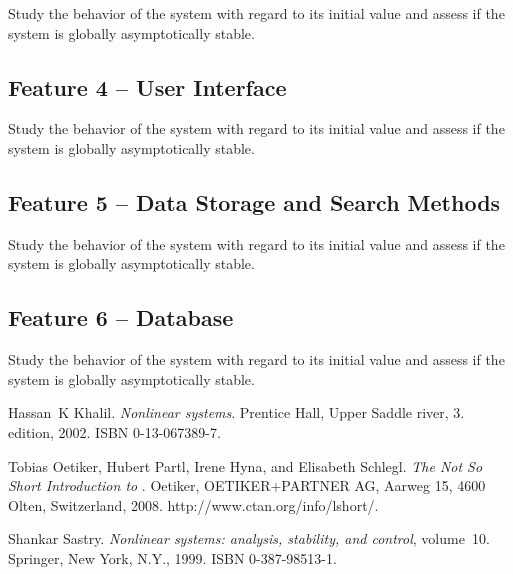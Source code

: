 \documentclass[a4paper]{article} %
\begin{document}
Study the behavior of the system with regard to its initial value and assess if the system is globally asymptotically stable.

\subsection*{Feature 4 -- User Interface}
\label{task1:feature4}

Study the behavior of the system with regard to its initial value and assess if the system is globally asymptotically stable.

\subsection*{Feature 5 -- Data Storage and Search Methods}
\label{task1:feature5}

Study the behavior of the system with regard to its initial value and assess if the system is globally asymptotically stable.

\subsection*{Feature 6 -- Database}
\label{task1:feature6}

Study the behavior of the system with regard to its initial value and assess if the system is globally asymptotically stable.




\begin{thebibliography}{99}
Hassan~K Khalil.
\newblock \emph{Nonlinear systems}.
\newblock Prentice Hall, Upper Saddle river, 3. edition, 2002.
\newblock ISBN 0-13-067389-7.

Tobias Oetiker, Hubert Partl, Irene Hyna, and Elisabeth Schlegl.
\newblock \emph{The Not So Short Introduction to \LaTeXe}.
\newblock Oetiker, OETIKER+PARTNER AG, Aarweg 15, 4600 Olten, Switzerland,
  2008.
\newblock http://www.ctan.org/info/lshort/.

Shankar Sastry.
\newblock \emph{Nonlinear systems: analysis, stability, and control},
  volume~10.
\newblock Springer, New York, N.Y., 1999.
\newblock ISBN 0-387-98513-1.
\end{thebibliography}
\end{document}

